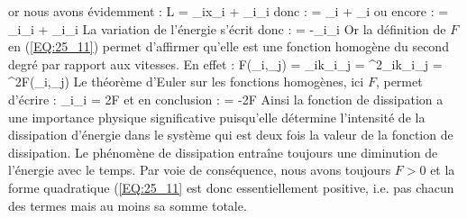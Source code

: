 \eea
or nous avons \'{e}videmment :
\benn
	L = \sum_{i}x_{i} + \sum_{i}_{i}
\eenn
donc :
\benn
	 = \sum_{i} + \sum_{i}
\eenn
ou encore :
\benn
	 = \sum_{i}_{i} + \sum_{i}_{i}
\eenn
La variation de l'\'{e}nergie s'\'{e}crit donc :
\benn
	 = -\sum_{i}_{i}
\eenn
Or la d\'{e}finition de $F$ en (\ref{EQ:25_11}) permet d'affirmer qu'elle est une fonction homog\`{e}ne du second degr\'{e} par rapport aux vitesses. En effet :
\benn
	F(\beta{}_{i},\beta{}_{j}) = \alpha_{ik}\beta{}_{i}\beta{}_{j} = \beta^{2}\alpha_{ik}_{i}_{j} = \beta^{2}F(_{i},_{j})
\eenn
Le th\'{e}or\`{e}me d'Euler sur les fonctions homog\`{e}nes, ici $F$, permet d'\'{e}crire :
\benn
	\sum_{i}_{i} = 2F
\eenn
et en conclusion :
\be
	 = -2F \label{EQ:25_13}
\ee
Ainsi la fonction de dissipation a une importance physique significative puisqu'elle d\'{e}termine l'intensit\'{e} de la dissipation d'\'{e}nergie dans le syst\`{e}me qui est deux fois la valeur de la fonction de dissipation. Le ph\'{e}nom\`{e}ne de dissipation entra\^{i}ne toujours une diminution de l'\'{e}nergie avec le temps. Par voie de cons\'{e}quence, nous avons toujours $F > 0$ et la forme quadratique (\ref{EQ:25_11} est donc essentiellement positive, i.e. pas chacun des termes mais au moins sa somme totale.